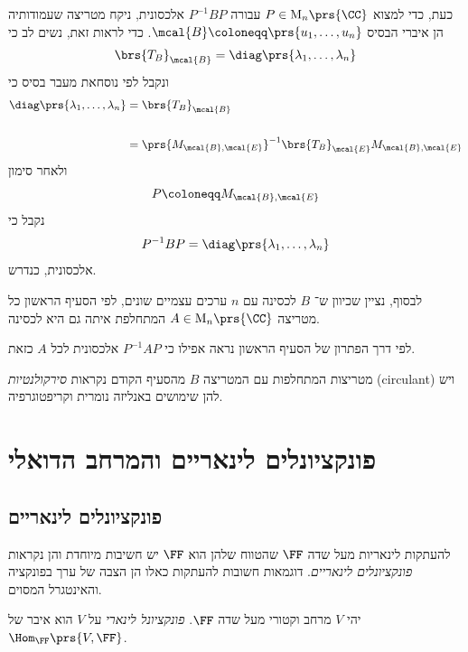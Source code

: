\documentclass[a4paper,10pt,twoside,openany]{book}
\renewcommand{\Mat}{\mathrm{M}}
\begin{document}
\begin{solution}
\begin{enumerate}
כעת, כדי למצוא
$P \in \Mat_n\prs{\CC}$
עבורה
$P^{-1} B P$
אלכסונית, ניקח מטריצה שעמודותיה הן איברי הבסיס
$\mcal{B} \coloneqq \prs{u_1, \ldots, u_n}$.
כדי לראות זאת, נשים לב כי
\begin{align*}
\brs{T_B}_{\mcal{B}} = \diag\prs{\lambda_1, \ldots, \lambda_n}
\end{align*}
ונקבל לפי נוסחאת מעבר בסיס כי
\begin{align*}
\diag\prs{\lambda_1, \ldots, \lambda_n} &= \brs{T_B}_{\mcal{B}}
\\
\\&=
\prs{M_{\mcal{B},\mcal{E}}}^{-1} \brs{T_B}_{\mcal{E}} M_{\mcal{B},\mcal{E}}
\end{align*}
ולאחר סימון
\begin{align*}
P \coloneqq M_{\mcal{B},\mcal{E}}
\end{align*}
נקבל כי
\begin{align*}
P^{-1} B P = \diag\prs{\lambda_1, \ldots, \lambda_n}
\end{align*}
אלכסונית, כנדרש.

לבסוף, נציין שכיוון ש־%
$B$
לכסינה עם
$n$
ערכים עצמיים שונים, לפי הסעיף הראשון כל מטריצה
$A \in \Mat_n\prs{\CC}$
המתחלפת איתה גם היא לכסינה.

לפי דרך הפתרון של הסעיף הראשון נראה אפילו כי
$P^{-1} A P$
אלכסונית לכל
$A$
כזאת.
\end{enumerate}
\end{solution}

\begin{remark}
מטריצות המתחלפות עם המטריצה
$B$
מהסעיף הקודם נקראות
\emph{סירקולנטיות}
\textenglish{(circulant)}
ויש להן שימושים באנליזה נומרית וקריפטוגרפיה.
\end{remark}

\chapter{פונקציונלים לינאריים והמרחב הדואלי}

\section{פונקציונלים לינאריים}

להעתקות לינאריות מעל שדה
$\FF$
שהטווח שלהן הוא
$\FF$
יש חשיבות מיוחדת והן נקראות
\emph{פונקציונלים לינאריים}.
דוגמאות חשובות להעתקות כאלו הן הצבה של ערך בפונקציה והאינטגרל המסוים.

\begin{definition}
יהי
$V$
מרחב וקטורי מעל שדה
$\FF$.
\emph{פונקציונל לינארי}
על
$V$
הוא איבר של
$\Hom_\FF\prs{V,\FF}$.
\end{definition}
\end{document}
